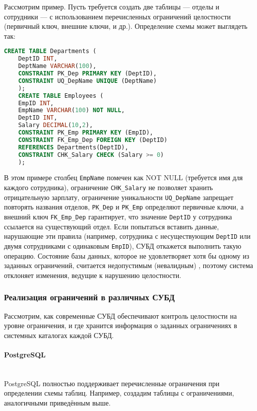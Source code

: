  Рассмотрим пример. Пусть требуется создать две таблицы — отделы и сотрудники — с использованием перечисленных ограничений целостности (первичный ключ, внешние ключи, и др.). Определение схемы может выглядеть так: 
 \begin{lstlisting}[language=SQL]
    CREATE TABLE Departments (
    DeptID INT,
    DeptName VARCHAR(100),
    CONSTRAINT PK_Dep PRIMARY KEY (DeptID),
    CONSTRAINT UQ_DepName UNIQUE (DeptName)
    ); 
    CREATE TABLE Employees (
    EmpID INT,
    EmpName VARCHAR(100) NOT NULL,
    DeptID INT,
    Salary DECIMAL(10,2),
    CONSTRAINT PK_Emp PRIMARY KEY (EmpID),
    CONSTRAINT FK_Emp_Dep FOREIGN KEY (DeptID)
    REFERENCES Departments(DeptID),
    CONSTRAINT CHK_Salary CHECK (Salary >= 0)
    );
 \end{lstlisting}

 В этом примере столбец \texttt{EmpName} помечен как NOT NULL (требуется имя для каждого сотрудника), ограничение \texttt{CHK\_Salary} не позволяет хранить отрицательную зарплату, ограничение уникальности \texttt{UQ\_DepName} запрещает повторять названия отделов, \texttt{PK\_Dep} и \texttt{PK\_Emp} определяют первичные ключи, а внешний ключ \texttt{FK\_Emp\_Dep} гарантирует, что значение \texttt{DeptID} у сотрудника ссылается на существующий отдел. Если попытаться вставить данные, нарушающие эти правила (например, сотрудника с несуществующим \texttt{DeptID} или двумя сотрудниками с одинаковым \texttt{EmpID}), СУБД откажется выполнить такую операцию. Состояние базы данных, которое не удовлетворяет хотя бы одному из заданных ограничений, считается недопустимым (невалидным) \autocite{ElmasriNavathe}, поэтому система отклоняет изменения, ведущие к нарушению целостности.


\subsubsection{Реализация ограничений в различных СУБД}

 Рассмотрим, как современные СУБД обеспечивают контроль целостности на уровне ограничения, и где хранится информация о заданных ограничениях в системных каталогах каждой СУБД. 

\paragraph{PostgreSQL} ~\\

 PostgreSQL полностью поддерживает перечисленные ограничения при определении схемы таблиц. Например, создадим таблицы с ограничениями, аналогичными приведённым выше.
 

